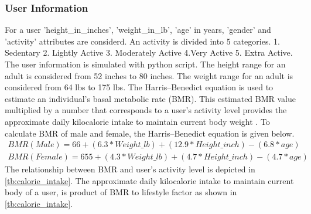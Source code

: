 \subsubsection{User Information}
\label{sec:user_info}
For a user 'height\_in\_inches', 'weight\_in\_lb', 'age' in years, 'gender' and 'activity' attributes are considerd. An activity is divided into 5 categories. 1. Sedentary 2. Lightly Active 3. Moderately Active 4.Very Active 5. Extra Active. The user information is simulated with python script. The height range for an adult is considered from 52 inches to 80 inches. The weight range for an adult is considered from 64 lbs to 175 lbs. The Harris–Benedict equation is used to estimate an individual's basal metabolic rate (BMR). This estimated BMR value multiplied by a number that corresponds to a user's activity level provides the approximate daily kilocalorie intake to maintain current body weight \cite{}. To calculate BMR of male and female, the Harris–Benedict equation is given below.
\begin{align}
BMR (Male) = 66 + (6.3 * Weight\_lb) + (12.9 * Height\_inch) - (6.8 * age) \\
BMR (Female) = 655 + (4.3 * Weight\_lb) + (4.7 * Height\_inch) - (4.7 * age)
\end{align}
The relationship between BMR and user's activity level is depicted in \autoref{tb:calorie_intake}.  The approximate daily kilocalorie intake to maintain current body of a user, is product of BMR to lifestyle factor as shown in \autoref{tb:calorie_intake}. 
